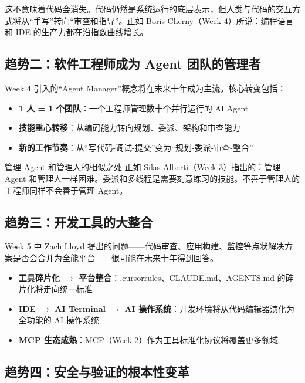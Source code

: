 \documentclass[a4paper]{article}
\begin{document}
这不意味着代码会消失。代码仍然是系统运行的底层表示，但人类与代码的交互方式将从``手写''转向``审查和指导''。正如 Boris Cherny（Week 4）所说：编程语言和 IDE 的生产力都在沿指数曲线增长。

\subsection{趋势二：软件工程师成为 Agent 团队的管理者}

Week 4 引入的``Agent Manager''概念将在未来十年成为主流。核心转变包括：

\begin{itemize}
    \item \textbf{1 人 = 1 个团队}：一个工程师管理数十个并行运行的 AI Agent
    \item \textbf{技能重心转移}：从编码能力转向规划、委派、架构和审查能力
    \item \textbf{新的工作节奏}：从``写代码-调试-提交''变为``规划-委派-审查-整合''
\end{itemize}

\begin{knowledgebox}{管理 Agent 和管理人的相似之处}
正如 Silas Alberti（Week 3）指出的：管理 Agent 和管理人一样困难。委派和多线程是需要刻意练习的技能。不善于管理人的工程师同样不会善于管理 Agent。
\end{knowledgebox}

\subsection{趋势三：开发工具的大整合}

Week 5 中 Zach Lloyd 提出的问题——代码审查、应用构建、监控等点状解决方案是否会合并为全能平台——很可能在未来十年得到回答。

\begin{itemize}
    \item \textbf{工具碎片化 $\rightarrow$ 平台整合}：.cursorrules、CLAUDE.md、AGENTS.md 的碎片化将走向统一标准
    \item \textbf{IDE $\rightarrow$ AI Terminal $\rightarrow$ AI 操作系统}：开发环境将从代码编辑器演化为全功能的 AI 操作系统
    \item \textbf{MCP 生态成熟}：MCP（Week 2）作为工具标准化协议将覆盖更多领域
\end{itemize}

\subsection{趋势四：安全与验证的根本性变革}
\end{document}
